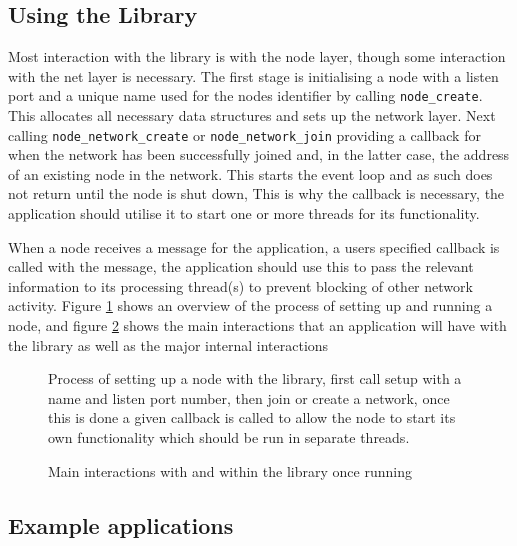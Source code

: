\documentclass{article}
\begin{document}
\subsection{Using the Library}

Most interaction with the library is with the node layer, though some interaction with the net layer is necessary.
The first stage is initialising a node with a listen port and a unique name used for the nodes identifier by calling \texttt{node\_create}. This allocates all necessary data structures and sets up the network layer.
Next calling \texttt{node\_network\_create} or \texttt{node\_network\_join} providing a callback for when the network has been successfully joined and, in the latter case, the address of an existing node in the network.
This starts the event loop and as such does not return until the node is shut down, This is why the callback is necessary, the application should utilise it to start one or more threads for its functionality.

When a node receives a message for the application, a users specified callback is called with the message, the application should use this to pass the relevant information to its processing thread(s) to prevent blocking of other network activity.
Figure \ref{fig:startlib} shows an overview of the process of setting up and running a node, and figure \ref{fig:runlib} shows the main interactions that an application will have with the library as well as the major internal interactions

\begin{figure}
\centering
\def\svgwidth{\columnwidth}

\caption{Process of setting up a node with the library, first call setup with a name and listen port number, then join or create a network, once this is done a given callback is called to allow the node to start its own functionality which should be run in separate threads.}
\label{fig:startlib}
\end{figure}


\begin{figure}
\centering
\def\svgwidth{1.4\columnwidth}
\begin{scriptsize}
\makebox[\columnwidth][c]{}
\end{scriptsize}
\caption{Main interactions with and within the library once running }
\label{fig:runlib}
\end{figure}

\subsection{Example applications}
\end{document}
